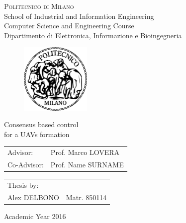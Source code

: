 \begin{titlepage}

\begin{center}
\Large{\textsc{Politecnico di Milano}}\\
\Large{School of Industrial and Information Engineering}\\
\large{Computer Science and Engineering Course}\\
\large{Dipartimento di Elettronica, Informazione e Bioingegneria}
\par
\end{center}

\vspace{0.2cm}

\begin{center}
\begin{figure}[h]
\centering{}
\includegraphics[width=0.3\textwidth]{title-page/logo-polimi}
\end{figure}
\par
\end{center}

\begin{center}
\LARGE{Consensus based control \\for a UAVs formation}
\vspace{1.0cm}
\par
\end{center}

\begin{flushleft}
\begin{tabular}{ll}
Advisor:  & Prof. Marco LOVERA\tabularnewline
Co-Advisor:  & Prof. Name SURNAME\tabularnewline
\end{tabular}\vspace{0.5cm}
\par
\end{flushleft}

\begin{flushright}
\begin{tabular}{ll}
Thesis by: & \tabularnewline
Alex DELBONO & Matr. 850114\tabularnewline
\end{tabular}\vspace{1cm}
\par
\end{flushright}

\begin{center}
{\large{}Academic Year 2016}
\par
\end{center}{\large \par}

\end{titlepage}
